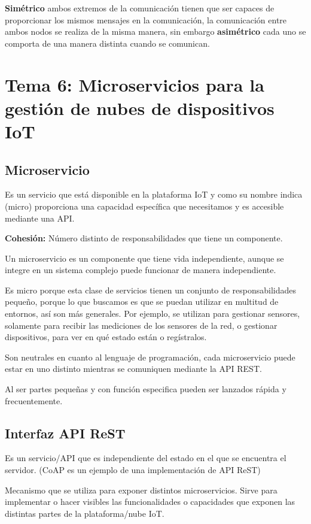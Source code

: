 \documentclass[12pt, twoside, openright]{report} %
\begin{document}
\textbf{Simétrico} ambos extremos de la comunicación tienen que ser capaces de proporcionar los mismos mensajes en la comunicación, la comunicación entre ambos nodos se realiza de la misma manera, sin embargo \textbf{asimétrico} cada uno se comporta de una manera distinta cuando se comunican.

\chapter{Tema 6: Microservicios para la gestión de nubes de dispositivos IoT}
\section{Microservicio}
Es un servicio que está disponible en la plataforma IoT y como su nombre indica (micro) proporciona una capacidad específica que necesitamos y es accesible mediante una API.

\textbf{Cohesión:} Número distinto de responsabilidades que tiene un componente.

Un microservicio es un componente que tiene vida independiente, aunque se integre en un sistema complejo puede funcionar de manera independiente.

Es micro porque esta clase de servicios tienen un conjunto de responsabilidades pequeño, porque lo que buscamos es que se puedan utilizar en multitud de entornos, así son más generales. Por ejemplo, se utilizan para gestionar sensores, solamente para recibir las mediciones de los sensores de la red, o gestionar dispositivos, para ver en qué estado están o regístralos.

Son neutrales en cuanto al lenguaje de programación, cada microservicio puede estar en uno distinto mientras se comuniquen mediante la API REST.

Al ser partes pequeñas y con función especifica pueden ser lanzados rápida y frecuentemente.

\section{Interfaz API ReST}
Es un servicio/API que es independiente del estado en el que se encuentra el servidor. (CoAP es un ejemplo de una implementación de API ReST)

Mecanismo que se utiliza para exponer distintos microservicios. Sirve para implementar o hacer visibles las funcionalidades o capacidades que exponen las distintas partes de la plataforma/nube IoT.
\end{document}
